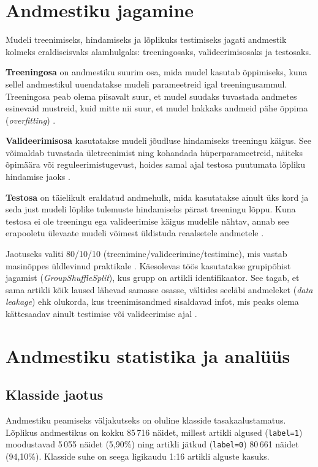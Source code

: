 \section{Andmestiku jagamine}\label{sec:andmestiku-jagamine}
Mudeli treenimiseks, hindamiseks ja lõplikuks testimiseks jagati 
andmestik kolmeks eraldiseisvaks alamhulgaks: treeningosaks, valideerimisosaks ja testosaks.

\textbf{Treeningosa} on andmestiku suurim osa, mida mudel kasutab õppimiseks, kuna sellel andmestikul uuendatakse mudeli parameetreid igal treeningusammul. Treeningosa peab olema piisavalt suur, et mudel suudaks tuvastada andmetes esinevaid mustreid, kuid mitte nii suur, et mudel hakkaks andmeid pähe õppima (\textit{overfitting}) \cite{encord2024split}.

\textbf{Valideerimisosa} kasutatakse mudeli jõudluse hindamiseks treeningu käigus. See võimaldab tuvastada ületreenimist ning kohandada hüperparameetreid, näiteks õpimäära või reguleerimistugevust, hoides samal ajal testosa puutumata lõpliku hindamise jaoks \cite{encord2024split}.

\textbf{Testosa} on täielikult eraldatud andmehulk, mida kasutatakse ainult üks kord ja seda just mudeli lõplike tulemuste hindamiseks pärast treeningu lõppu. Kuna testosa ei ole treeningu ega valideerimise käigus mudelile nähtav, annab see erapooletu ülevaate mudeli võimest üldistuda reaalsetele andmetele \cite{encord2024split}.

Jaotuseks valiti 80/10/10 (treenimine/valideerimine/testimine), mis vastab masinõppes üldlevinud praktikale \cite{encord2024split}. Käesolevas töös kasutatakse grupipõhist jagamist (\textit{GroupShuffleSplit}), kus grupp on artikli identifikaator. See tagab, et sama artikli kõik laused lähevad samasse osasse, vältides seeläbi andmeleket (\textit{data leakage}) ehk olukorda, kus treenimisandmed sisaldavad infot, mis peaks olema kättesaadav ainult testimise või valideerimise ajal \cite{encord2024split}.


\section{Andmestiku statistika ja analüüs}\label{sec:andmestiku-statistika}
\subsection{Klasside jaotus}\label{subsec:klasside-jaotus}
Andmestiku peamiseks väljakutseks on oluline klasside tasakaalustamatus. Lõplikus andmestikus on kokku 85\,716 näidet, millest artikli algused (\texttt{label=1}) moodustavad 5\,055 näidet (5,90\%) ning artikli jätkud (\texttt{label=0}) 80\,661 näidet (94,10\%). Klasside suhe on seega ligikaudu 1:16 artikli alguste kasuks.

